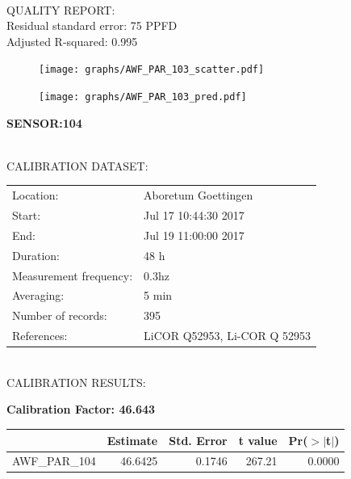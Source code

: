 \documentclass[oneside]{report}
\begin{document}
\hrulefill\\
QUALITY REPORT:\\
Residual standard error: 75 PPFD\\
Adjusted R-squared: 0.995



\begin{figure}[H]
  \centering
  \texttt{[image: graphs/AWF\_PAR\_103\_scatter.pdf]}
\end{figure}




\begin{figure}[H]
  \centering
  \texttt{[image: graphs/AWF\_PAR\_103\_pred.pdf]}
\end{figure}

\pagebreak


\begin{center}
\large{\textbf{SENSOR:104}}\\
\end{center}

\hrulefill\\
CALIBRATION DATASET:\\
\begin{table}[h!]
  \centering
  \label{tab:table1}
  \begin{tabular}{ll}
    Location: & Aboretum Goettingen\\ 
    
    
    Start:  & Jul 17 10:44:30 2017 \\
    End:   & Jul 19 11:00:00 2017\\ 
    Duration: & 48 h\\
    Measurement frequency: & 0.3hz\\
    Averaging:  &5 min\\
    Number of records: & 395 \\
    References: & LiCOR Q52953, Li-COR Q 52953 \\
  \end{tabular}
\end{table}

\hrulefill\\
CALIBRATION RESULTS:\\


\begin{center}
\textbf{\large{Calibration Factor: 46.643}}\\
\end{center}
\begin{table}[ht]
\centering
\begin{tabular}{rrrrr}
  \hline
 & Estimate & Std. Error & t value & Pr($>$$|$t$|$) \\ 
  \hline
AWF\_PAR\_104 & 46.6425 & 0.1746 & 267.21 & 0.0000 \\ 
   \hline
\end{tabular}
\end{table}
\end{document}
